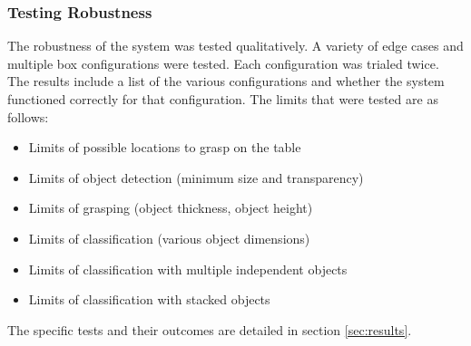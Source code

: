 \documentclass[letterpaper, 10 pt, conference]{conf/ieeeconf}  %
\begin{document}
\subsubsection{Testing Robustness}
The robustness of the system was tested qualitatively. A variety of edge cases
and multiple box configurations were tested. Each configuration was trialed
twice. The results include a list of the various configurations and whether the
system functioned correctly for that configuration. The limits that were tested
are as follows:

\begin{itemize}
\item Limits of possible locations to grasp on the table
\item Limits of object detection (minimum size and transparency)
\item Limits of grasping (object thickness, object height)
\item Limits of classification (various object dimensions)
\item Limits of classification with multiple independent objects
\item Limits of classification with stacked objects
\end{itemize}

The specific tests and their outcomes are detailed in section \ref{sec:results}.

\end{document}
